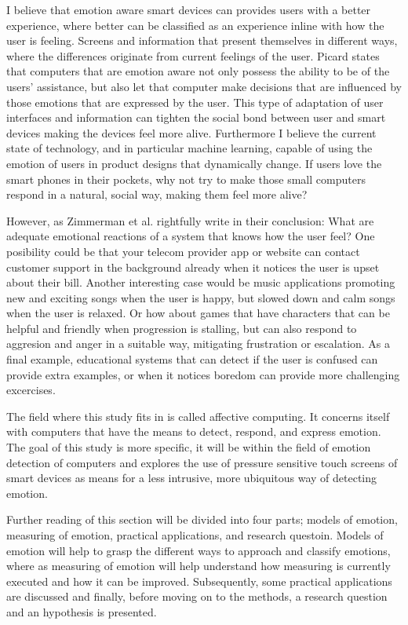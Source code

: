 \documentclass{sigchi}
\begin{document}
I believe that emotion aware smart devices can provides users with a better experience, where better can be classified as an experience inline with how the user is feeling. Screens and information that present themselves in different ways, where the differences originate from current feelings of the user. Picard \cite{Picard1995} states that computers that are emotion aware not only possess the ability to be of the users' assistance, but also let that computer make decisions that are influenced by those emotions that are expressed by the user. This type of adaptation of user interfaces and information can tighten the social bond between user and smart devices making the devices feel more alive. Furthermore I believe the current state of technology, and in particular machine learning, capable of using the emotion of users in product designs that dynamically change. If users love the smart phones in their pockets, why not try to make those small computers respond in a natural, social way, making them feel more alive?

However, as Zimmerman et al. \cite{Zimmermann2003} rightfully write in their conclusion: What are adequate emotional reactions of a system that knows how the user feel? One posibility could be that your telecom provider app or website can contact customer support in the background already when it notices the user is upset about their bill. Another interesting case would be music applications promoting new and exciting songs when the user is happy, but slowed down and calm songs when the user is relaxed. Or how about games that have characters that can be helpful and friendly when progression is stalling, but can also respond to aggresion and anger in a suitable way, mitigating frustration or escalation. As a final example, educational systems that can detect if the user is confused can provide extra examples, or when it notices boredom can provide more challenging excercises.

The field where this study fits in is called affective computing. It concerns itself with computers that have the means to detect, respond, and express emotion. The goal of this study is more specific, it will be within the field of emotion detection of computers and explores the use of pressure sensitive touch screens of smart devices as means for a less intrusive, more ubiquitous way of detecting emotion.

Further reading of this section will be divided into four parts; models of emotion, measuring of emotion, practical applications, and research questoin. Models of emotion will help to grasp the different ways to approach and classify emotions, where as measuring of emotion will help understand how measuring is currently executed and how it can be improved. Subsequently, some practical applications are discussed and finally, before moving on to the methods, a research question and an hypothesis is presented.
\end{document}
